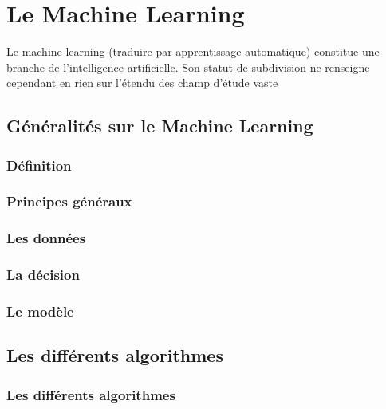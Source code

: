 \chapter{ Le  Machine Learning}
\label{Le Machine Learning}
\thispagestyle{fancy}
Le machine learning (traduire par apprentissage automatique) constitue une branche de l'intelligence artificielle. Son statut de subdivision ne renseigne cependant en rien sur l'étendu  des   champ d'étude vaste 

\section{Généralités sur le Machine Learning}
\label{Le Machine Learning: Généralités sur le Machine Learning}

\subsection{Définition}
\label{Le Machine Learning: Les différents algorithmes: Définition}

\subsection{Principes généraux}
\label{Le Machine Learning: Les différents algorithmes: Principes généraux}

\subsection{Les données}
\label{Le Machine Learning: Les différents algorithmes: Les données}

\subsection{La décision}
\label{Le Machine Learning: Les différents algorithmes: La décision}

\subsection{Le modèle}
\label{Le Machine Learning: Les différents algorithmes: Le modèle}


\section{Les différents algorithmes}
\label{ILe Machine Learning: Les différents algorithmes}

\subsection{Les différents algorithmes}
\label{ILe Machine Learning: Les différents algorithmes: La regression logistique}

